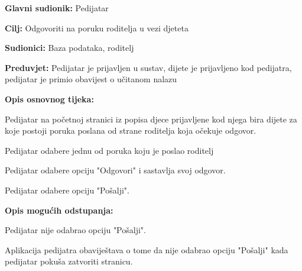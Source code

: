 					\noindent {}
					\begin{packed_item}
						
						\item \textbf{Glavni sudionik: }Pedijatar
						\item  \textbf{Cilj:} Odgovoriti na poruku roditelja u vezi djeteta
						\item  \textbf{Sudionici:} Baza podataka, roditelj
						\item  \textbf{Preduvjet:} Pedijatar je prijavljen u sustav, dijete je prijavljeno kod pedijatra, pedijatar je primio obavijest o učitanom nalazu
						\item  \textbf{Opis osnovnog tijeka:}
						
						\item[] \begin{packed_enum}
							
							\item Pedijatar na početnoj stranici iz popisa djece prijavljene kod njega bira dijete za koje postoji poruka poslana od strane roditelja koja očekuje odgovor.
							\item Pedijatar odabere jednu od poruka koju je poslao roditelj
							\item Pedijatar odabere opciju "Odgovori" i sastavlja svoj odgovor.
							\item Pedijatar odabere opciju "Pošalji".
						\end{packed_enum}
						
						\item  \textbf{Opis mogućih odstupanja:}
						
						\item[] \begin{packed_item}
							
							\item[4.a] Pedijatar nije odabrao opciju "Pošalji".
							\item[] \begin{packed_enum}
								
								\item Aplikacija pedijatra obaviještava o tome da nije odabrao opciju "Pošalji" kada pedijatar pokuša zatvoriti stranicu.
							\end{packed_enum}
							
							
						\end{packed_item}
						
						
					\end{packed_item}
					
